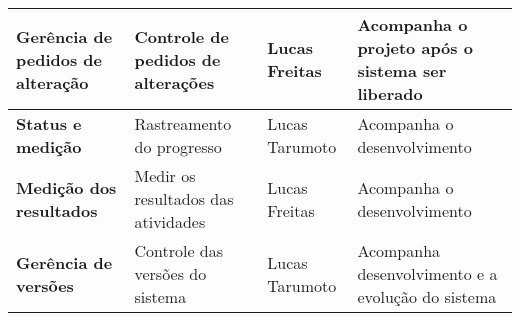 \begin{longtable}[c]{|p{11.28em}|p{16.055em}|p{6.665em}|p{6.22em}|}
    \midrule
    \textbf{Gerência de pedidos de alteração} & Controle de pedidos de alterações & Lucas Freitas & Acompanha o projeto após o sistema ser liberado \\
    \midrule
    \textbf{Status e medição} & Rastreamento do progresso & Lucas Tarumoto & Acompanha o desenvolvimento \\
    \midrule
    \textbf{Medição dos resultados} & Medir os resultados das atividades & Lucas Freitas & Acompanha o desenvolvimento \\
    \midrule
    \textbf{Gerência de versões} & Controle das versões do sistema & Lucas Tarumoto & Acompanha desenvolvimento e a evolução do sistema \\
    \bottomrule
 
\end{longtable}%
